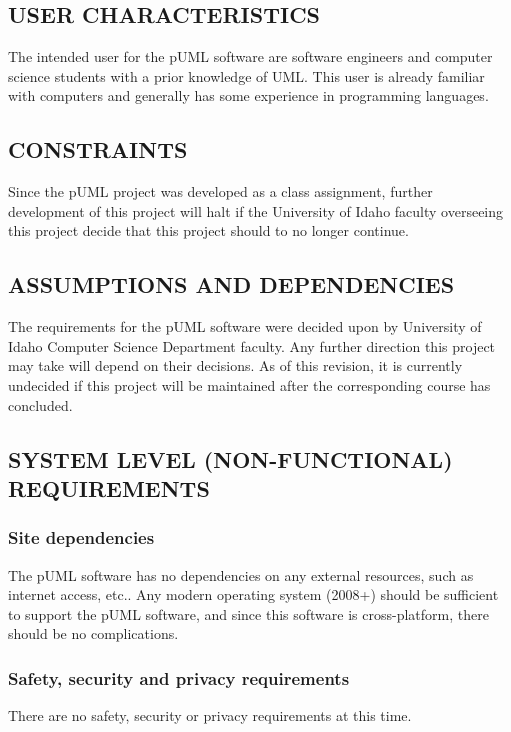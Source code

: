 \documentclass[twoside,letterpaper]{article}
\begin{document}
\subsection[USER CHARACTERISTICS]{\rmfamily\bfseries
USER CHARACTERISTICS}
{
The intended user for the pUML software are software engineers and computer science students with a prior knowledge of UML. This user is already familiar with computers and generally has some experience in programming languages.
}

\subsection[CONSTRAINTS]{\rmfamily\bfseries
CONSTRAINTS}
{
Since the pUML project was developed as a class assignment,
further development of this project will halt if the University of Idaho faculty overseeing this project decide that this project should to no longer continue.
}

\subsection[ASSUMPTIONS AND DEPENDENCIES]{\rmfamily\bfseries
ASSUMPTIONS AND DEPENDENCIES}
{
The requirements for the pUML software were decided upon by University of Idaho Computer Science Department faculty.  Any further direction this project may take will depend on their decisions. As of this revision, it is currently undecided if this project will be maintained after the corresponding course has concluded. 
}




\subsection[SYSTEM LEVEL (NON{}-FUNCTIONAL)
REQUIREMENTS]{\rmfamily\bfseries
SYSTEM LEVEL (NON-FUNCTIONAL) REQUIREMENTS}

\subsubsection[Site dependencies]{\rmfamily\bfseries
Site dependencies}
{
The pUML software has no dependencies on any external resources, such as internet access, etc..
Any modern operating system (2008+) should be sufficient to support the pUML software,
and since this software is cross-platform, there should be no complications.
}

\subsubsection[Safety, security and privacy requirements]{\rmfamily\bfseries
Safety, security and privacy requirements}
{
There are no safety, security or privacy requirements at this time.
}
\end{document}
